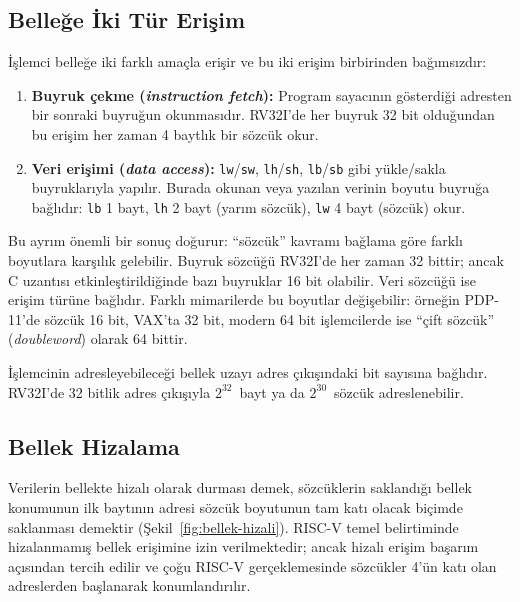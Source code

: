 \subsection{Belleğe İki Tür Erişim}
İşlemci belleğe iki farklı amaçla erişir ve bu iki erişim birbirinden bağımsızdır:

\begin{enumerate}[nosep]
\item \textbf{Buyruk çekme (\emph{instruction fetch}):} Program sayacının gösterdiği adresten bir sonraki buyruğun okunmasıdır. RV32I'de her buyruk 32 bit olduğundan bu erişim her zaman 4 baytlık bir sözcük okur.
\item \textbf{Veri erişimi (\emph{data access}):} \texttt{lw}/\texttt{sw}, \texttt{lh}/\texttt{sh}, \texttt{lb}/\texttt{sb} gibi yükle/sakla buyruklarıyla yapılır. Burada okunan veya yazılan verinin boyutu buyruğa bağlıdır: \texttt{lb} 1 bayt, \texttt{lh} 2 bayt (yarım sözcük), \texttt{lw} 4 bayt (sözcük) okur.
\end{enumerate}

Bu ayrım önemli bir sonuç doğurur: ``sözcük'' kavramı bağlama göre farklı boyutlara karşılık gelebilir. Buyruk sözcüğü RV32I'de her zaman 32 bittir; ancak C uzantısı etkinleştirildiğinde bazı buyruklar 16 bit olabilir. Veri sözcüğü ise erişim türüne bağlıdır. Farklı mimarilerde bu boyutlar değişebilir: örneğin PDP-11'de sözcük 16 bit, VAX'ta 32 bit, modern 64 bit işlemcilerde ise ``çift sözcük'' (\emph{doubleword}) olarak 64 bittir.

İşlemcinin adresleyebileceği bellek uzayı adres çıkışındaki bit sayısına bağlıdır. RV32I'de 32 bitlik adres çıkışıyla $2^{32}$~bayt ya da $2^{30}$~sözcük adreslenebilir.

\subsection{Bellek Hizalama}
Verilerin bellekte hizalı olarak durması demek, sözcüklerin saklandığı bellek konumunun ilk baytının adresi sözcük boyutunun tam katı olacak biçimde saklanması demektir (Şekil~\ref{fig:bellek-hizali}). RISC-V temel belirtiminde hizalanmamış bellek erişimine izin verilmektedir; ancak hizalı erişim başarım açısından tercih edilir ve çoğu RISC-V gerçeklemesinde sözcükler 4'ün katı olan adreslerden başlanarak konumlandırılır.

